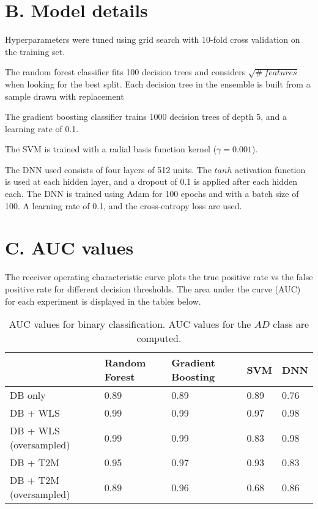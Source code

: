 \documentclass{article}
\begin{document}
\newpage
\section*{B. Model details}

Hyperparameters were tuned using grid search with 10-fold cross validation on the training set.

The random forest classifier fits 100 decision trees and considers $\sqrt{\# \ features}$ when looking for the best split. Each decision tree in the ensemble is built from a sample drawn with replacement

The gradient boosting classifier trains 1000 decision trees of depth 5, and a learning rate of 0.1. 

The SVM is trained with a radial basis function kernel ($\gamma = 0.001$).

The DNN used consists of four layers of 512 units. The $tanh$ activation function is used at each hidden layer, and a dropout of 0.1 is applied after each hidden each. The DNN is trained using Adam for 100 epochs and with a batch size of 100.  A learning rate of 0.1, and the cross-entropy loss are used.

\newpage
\section*{C. AUC values}
The receiver operating characteristic curve plots the true positive rate vs the false positive rate for different decision thresholds. The area under the curve (AUC) for each experiment is displayed in the tables below.

\begin{table}[h]
\centering
\caption{AUC values for binary classification. AUC values for the $AD$ class are computed.}
\label{aucbinary}
\begin{tabular}{|l|l|l|l|l|}
\hline
                        & Random Forest & Gradient Boosting & SVM & DNN  \\ \hline
DB only                 & 0.89          & 0.89              &   0.89 & 0.76 \\ \hline
DB + WLS                & 0.99          & 0.99              &  0.97   & 0.98 \\ \hline
DB +  WLS (oversampled) & 0.99          & 0.99              &  0.83   & 0.98 \\ \hline
DB +  T2M               & 0.95          & 0.97              & 0.93    & 0.83 \\ \hline
DB + T2M (oversampled)  & 0.89          & 0.96              & 0.68    & 0.86 \\ \hline
\end{tabular}
\end{table}
\end{document}
